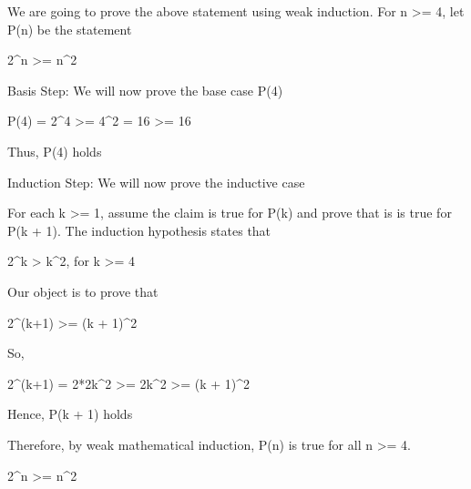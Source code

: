 
We are going to prove the above statement using weak induction. For n >= 4, let P(n) be the statement

2^n >= n^2

Basis Step: We will now prove the base case P(4)

P(4) = 2^4 >= 4^2 = 16 >= 16

Thus, P(4) holds

Induction Step: We will now prove the inductive case

For each k >= 1, assume the claim is true for P(k) and prove that is is true for P(k + 1). The induction hypothesis states that

2^k > k^2, for k >= 4

Our object is to prove that

2^(k+1) >= (k + 1)^2

So,

2^(k+1) = 2*2k^2 >= 2k^2 >= (k + 1)^2

Hence, P(k + 1) holds

Therefore, by weak mathematical induction, P(n) is true for all n >= 4.

2^n >= n^2

